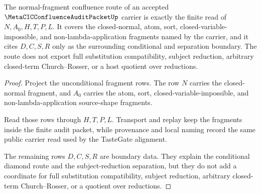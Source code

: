 \begin{theorem}
\label{thm:metacic-confluence-audit-normal-fragment}
The normal-fragment confluence route of an accepted
$\MetaCICConfluenceAuditPacketUp$ carrier is exactly the finite read of
$N,A_0,H,T,P,L$. It covers the closed-normal, atom, sort,
closed-variable-impossible, and non-lambda-application fragments named by the
carrier, and it cites $D,C,S,R$ only as the surrounding conditional and
separation boundary. The route does not export full substitution
compatibility, subject reduction, arbitrary closed-term Church--Rosser, or a
host quotient over reductions.
\end{theorem}
\begin{proof}
Project the unconditional fragment rows. The row $N$ carries the closed-normal
fragment, and $A_0$ carries the atom, sort, closed-variable-impossible, and
non-lambda-application source-shape fragments.

Read those rows through $H,T,P,L$. Transport and replay keep the fragments
inside the finite audit packet, while provenance and local naming record the
same public carrier read used by the TasteGate alignment.

The remaining rows $D,C,S,R$ are boundary data. They explain the conditional
diamond route and the subject-reduction separation, but they do not add a
coordinate for full substitution compatibility, subject reduction, arbitrary
closed-term Church--Rosser, or a quotient over reductions.
\end{proof}

